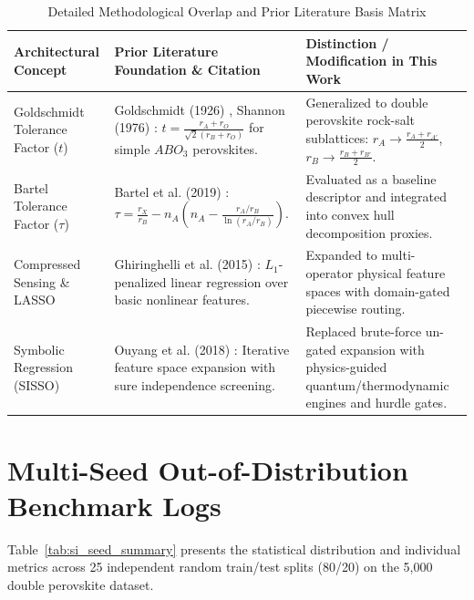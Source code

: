 \documentclass[11pt,a4paper]{article}
\begin{document}
\begin{table}[H]
\centering
\caption{Detailed Methodological Overlap and Prior Literature Basis Matrix}
\label{tab:si_method_overlap}
\small
\begin{tabularx}{\textwidth}{p{} p{} X}
\toprule
\textbf{Architectural Concept} & \textbf{Prior Literature Foundation \& Citation} & \textbf{Distinction / Modification in This Work} \\
\midrule
Goldschmidt Tolerance Factor ($t$) & Goldschmidt (1926) \cite{goldschmidt1926gesetze}, Shannon (1976) \cite{shannon1976revised}: $t = \frac{r_A + r_O}{\sqrt{2}(r_B + r_O)}$ for simple $ABO_3$ perovskites. & Generalized to double perovskite rock-salt sublattices: $r_A \to \frac{r_A + r_{A'}}{2}$, $r_B \to \frac{r_B + r_{B'}}{2}$. \\
\addlinespace
Bartel Tolerance Factor ($\tau$) & Bartel et al. (2019) \cite{bartel2019new}: $\tau = \frac{r_X}{r_B} - n_A \left( n_A - \frac{r_A/r_B}{\ln(r_A/r_B)} \right)$. & Evaluated as a baseline descriptor and integrated into convex hull decomposition proxies. \\
\addlinespace
Compressed Sensing \& LASSO & Ghiringhelli et al. (2015) \cite{ghiringhelli2015bigdata}: $L_1$-penalized linear regression over basic nonlinear features. & Expanded to multi-operator physical feature spaces with domain-gated piecewise routing. \\
\addlinespace
Symbolic Regression (SISSO) & Ouyang et al. (2018) \cite{ouyang2018sisso}: Iterative feature space expansion with sure independence screening. & Replaced brute-force un-gated expansion with physics-guided quantum/thermodynamic engines and hurdle gates. \\
\bottomrule
\end{tabularx}
\end{table}

\newpage

\section{Multi-Seed Out-of-Distribution Benchmark Logs}
\label{sec:si_multi_seed}

Table~\ref{tab:si_seed_summary} presents the statistical distribution and individual metrics across 25 independent random train/test splits (80/20) on the 5,000 double perovskite dataset.
\end{document}
